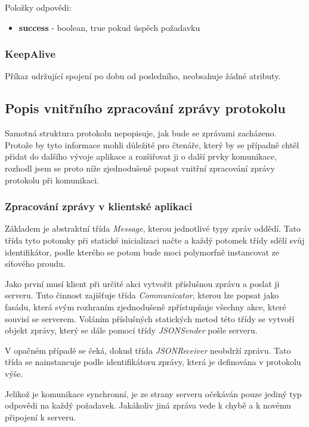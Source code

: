 \documentclass[thesis=B,czech]{FITthesis}[2013/10/20]
\begin{document}
Položky odpovědi:
\begin{itemize}
  \item \textbf{success} - boolean, true pokud úspěch požadavku
\end{itemize}

\subsubsection{KeepAlive}
Příkaz udržující spojení po dobu od posledního, neobsahuje žádné atributy.

\subsection{Popis vnitřního zpracování zprávy protokolu}

Samotná struktura protokolu nepopisuje, jak bude se zprávami zacházeno. Protože by tyto informace mohli důležité pro čtenáře, který by se případně chtěl přidat do dalšího vývoje aplikace a rozšiřovat ji o další prvky komunikace, rozhodl jsem se proto níže zjednodušeně popsat vnitřní zpracování zprávy protokolu při komunikaci.

\subsubsection{Zpracování zprávy v klientské aplikaci}

Základem je abstraktní třída \textit{Message}, kterou jednotlivé typy zpráv oddědí. Tato třída tyto potomky při statické inicializaci načte a každý potomek třídy sdělí svůj identifikátor, podle kterého se potom bude moci polymorfně instancovat ze síťového proudu.

Jako první musí klient při určité akci vytvořit příslušnou zprávu a poslat ji serveru. Tuto činnost zajišťuje třída \textit{Communicator}, kterou lze popsat jako fasádu, která svým rozhraním zjednodušeně zpřístupňuje všechny akce, které souvisí se serverem. Voláním příslušných statických metod této třídy se vytvoří objekt zprávy, který se dále pomocí třídy \textit{JSONSender} pošle serveru.

V opačném případě se čeká, dokud třída \textit{JSONReceiver} neobdrží zprávu. Tato třída se nainstancuje podle identifikátoru zprávy, která je definována v protokolu výše.

Jelikož je komunikace synchronní, je ze strany serveru očekáván pouze jediný typ odpovědi na každý požadavek. Jakákoliv jiná zpráva vede k chybě a k novému připojení k serveru.
\end{document}
